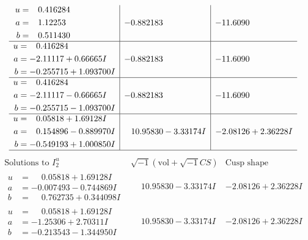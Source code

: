 \documentclass[1p]{elsarticle_modified}
\theoremstyle{definition}
\newcommand{\I}{\sqrt{-1}}
\begin{document}
$$\begin{array}{c|c|c}
\begin{aligned}
u &= \phantom{-}0.416284\phantom{ +0.000000I} \\
a &= \phantom{-}1.12253\phantom{ +0.000000I} \\
b &= \phantom{-}0.511430\phantom{ +0.000000I}\end{aligned}
 & -0.882183\phantom{ +0.000000I} & -11.6090\phantom{ +0.000000I} \\ \hline\begin{aligned}
u &= \phantom{-}0.416284\phantom{ +0.000000I} \\
a &= -2.11117 + 0.66665 I \\
b &= -0.255715 + 1.093700 I\end{aligned}
 & -0.882183\phantom{ +0.000000I} & -11.6090\phantom{ +0.000000I} \\ \hline\begin{aligned}
u &= \phantom{-}0.416284\phantom{ +0.000000I} \\
a &= -2.11117 - 0.66665 I \\
b &= -0.255715 - 1.093700 I\end{aligned}
 & -0.882183\phantom{ +0.000000I} & -11.6090\phantom{ +0.000000I} \\ \hline\begin{aligned}
u &= \phantom{-}0.05818 + 1.69128 I \\
a &= \phantom{-}0.154896 - 0.889970 I \\
b &= -0.549193 + 1.000850 I\end{aligned}
 & \phantom{-}10.95830 - 3.33174 I & -2.08126 + 2.36228 I\\
 \hline 
 \end{array}$$\newpage$$\begin{array}{c|c|c}  
\text{Solutions to }I^u_{2}& \I (\text{vol} + \sqrt{-1}CS) & \text{Cusp shape}\\
 \hline 
\begin{aligned}
u &= \phantom{-}0.05818 + 1.69128 I \\
a &= -0.007493 - 0.744869 I \\
b &= \phantom{-}0.762735 + 0.344098 I\end{aligned}
 & \phantom{-}10.95830 - 3.33174 I & -2.08126 + 2.36228 I \\ \hline\begin{aligned}
u &= \phantom{-}0.05818 + 1.69128 I \\
a &= -1.25306 + 2.70311 I \\
b &= -0.213543 - 1.344950 I\end{aligned}
 & \phantom{-}10.95830 - 3.33174 I & -2.08126 + 2.36228 I \\ \hline\begin{aligned}

\end{aligned}
\end{array}$$
\end{document}
